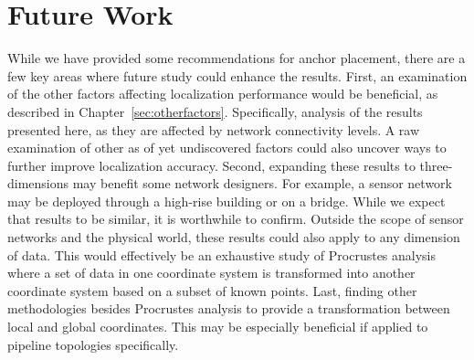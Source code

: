 \section{Future Work}
While we have provided some recommendations for anchor placement, there are a few key areas where future study could enhance the results.  First, an examination of the other factors affecting localization performance would be beneficial, as described in Chapter~\ref{sec:otherfactors}.  Specifically, analysis of the results presented here, as they are affected by network connectivity levels. A raw examination of other as of yet undiscovered factors could also uncover ways to further improve localization accuracy.  Second, expanding these results to three-dimensions may benefit some network designers.  For example, a sensor network may be deployed through a high-rise building or on a bridge.  While we expect that results to be similar, it is worthwhile to confirm.  Outside the scope of sensor networks and the physical world, these results could also apply to any dimension of data.  This would effectively be an exhaustive study of Procrustes analysis where a set of data in one coordinate system is transformed into another coordinate system based on a subset of known points.  Last, finding other methodologies besides Procrustes analysis to provide a transformation between local and global coordinates.  This may be especially beneficial if applied to pipeline topologies specifically.
